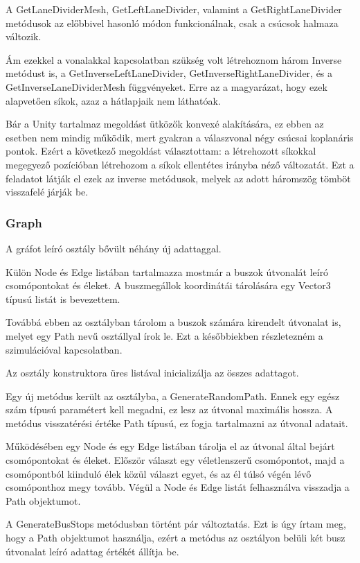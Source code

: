 A GetLaneDividerMesh, GetLeftLaneDivider, valamint a GetRightLaneDivider metódusok az előbbivel hasonló módon funkcionálnak, csak a csúcsok halmaza változik.

Ám ezekkel a vonalakkal kapcsolatban szükség volt létrehoznom három Inverse metódust is, a GetInverseLeftLaneDivider, GetInverseRightLaneDivider, és a GetInverseLaneDividerMesh függvényeket. Erre az a magyarázat, hogy ezek alapvetően síkok, azaz a hátlapjaik nem láthatóak. 

Bár a Unity tartalmaz megoldást ütközők konvexé alakítására, ez ebben az esetben nem mindig működik, mert gyakran a válaszvonal négy csúcsai koplanáris pontok. Ezért a következő megoldást választottam: a létrehozott síkokkal megegyező pozícióban létrehozom a síkok ellentétes irányba néző változatát. Ezt a feladatot látják el ezek az inverse metódusok, melyek az adott háromszög tömböt visszafelé járják be.

\subsubsection{Graph}
A gráfot leíró osztály bővült néhány új adattaggal. 

Külön Node és Edge listában tartalmazza mostmár a buszok útvonalát leíró csomópontokat és éleket. A buszmegállok koordinátái tárolására egy Vector3 típusú listát is bevezettem.

Továbbá ebben az osztályban tárolom a buszok számára kirendelt útvonalat is, melyet egy Path nevű osztállyal írok le. Ezt a későbbiekben részletezném a szimulációval kapcsolatban.

Az osztály konstruktora üres listával inicializálja az összes adattagot.

Egy új metódus került az osztályba, a GenerateRandomPath. Ennek egy egész szám típusú paramétert kell megadni, ez lesz az útvonal maximális hossza. A metódus visszatérési értéke Path típusú, ez fogja tartalmazni az útvonal adatait.

Működésében egy Node és egy Edge listában tárolja el az útvonal által bejárt csomópontokat és éleket. Először választ egy véletlenszerű csomópontot, majd a csomópontból kiinduló élek közül választ egyet, és az él túlsó végén lévő csomóponthoz megy tovább. Végül a Node és Edge listát felhasználva visszadja a Path objektumot.

A GenerateBusStops metódusban történt pár változtatás. Ezt is úgy írtam meg, hogy a Path objektumot használja, ezért a metódus az osztályon belüli két busz útvonalat leíró adattag értékét állítja be.

